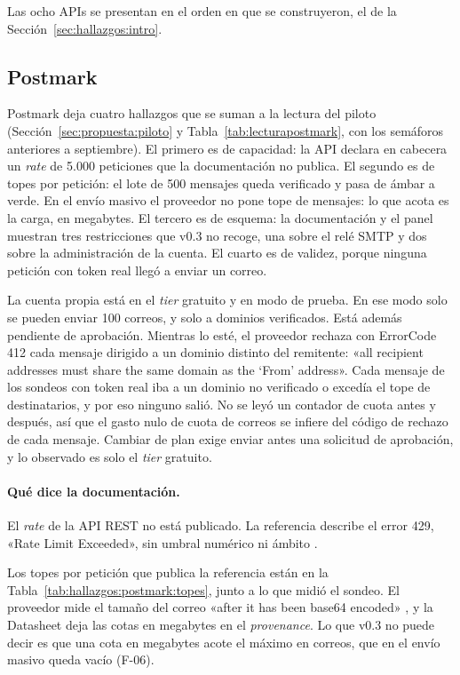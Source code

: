 Las ocho APIs se presentan en el orden en que se construyeron, el de la
Sección~\ref{sec:hallazgos:intro}.

\subsection{Postmark}
\label{subsec:hallazgos:postmark}

Postmark \citep{postmarkpricing,postmarkapi} deja cuatro hallazgos que se
suman a la lectura del piloto
(Sección~\ref{sec:propuesta:piloto} y Tabla~\ref{tab:lecturapostmark}, con
los semáforos anteriores a septiembre). El primero es de capacidad: la API
declara en cabecera un \textit{rate} de 5.000 peticiones que la
documentación no publica. El segundo es de topes por petición: el lote de
500 mensajes queda verificado y pasa de ámbar a verde. En el envío masivo el proveedor no pone tope de mensajes:
lo que acota es la carga, en megabytes. El tercero es de esquema: la
documentación y el panel muestran tres restricciones que v0.3 no recoge,
una sobre el relé SMTP y dos sobre la administración de la cuenta. El
cuarto es de validez, porque ninguna petición con token real llegó a enviar
un correo.

La cuenta propia está en el \textit{tier} gratuito y en modo de prueba. En
ese modo solo se pueden enviar 100 correos, y solo a dominios verificados.
Está además pendiente de aprobación. Mientras lo esté, el proveedor rechaza
con ErrorCode 412 cada mensaje dirigido a un dominio distinto del
remitente: «all recipient addresses must share the same domain as the
`From' address». Cada mensaje de los sondeos con token real iba a un
dominio no verificado o excedía el tope de destinatarios, y por eso ninguno
salió. No se leyó un contador de cuota antes y después, así que el gasto
nulo de cuota de correos se infiere del código de rechazo de cada mensaje.
Cambiar de plan exige enviar antes una solicitud de aprobación, y lo
observado es solo el \textit{tier} gratuito.

\paragraph{Qué dice la documentación.} El \textit{rate} de la API REST no
está publicado. La referencia describe el error 429, «Rate Limit
Exceeded», sin umbral numérico ni ámbito \citep{postmarkapi}.

Los topes por petición que publica la referencia están en la
Tabla~\ref{tab:hallazgos:postmark:topes}, junto a lo que midió el sondeo.
El proveedor mide el tamaño del correo «after it has been base64 encoded»
\citep{postmarkapi}, y la Datasheet deja las cotas en megabytes en el
\textit{provenance}. Lo que v0.3 no puede decir es que una cota en megabytes acote el máximo en
correos, que en el envío masivo queda vacío (F-06).

